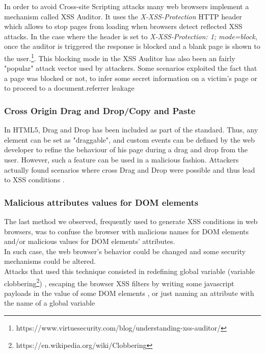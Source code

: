 \documentclass[journal]{IEEEtran}
\begin{document}
In order to avoid Cross-site Scripting attacks many web browsers implement a mechanism called XSS Auditor. It uses the \emph{X-XSS-Protection} HTTP header which allows to stop pages from loading when browsers detect reflected XSS attacks. In the case where the header is set to \emph{X-XSS-Protection: 1; mode=block}, once the auditor is triggered the response is blocked and a blank page is shown to the user.\footnote{https://www.virtuesecurity.com/blog/understanding-xss-auditor/}. This blocking mode in the XSS Auditor has also been an fairly "popular" attack vector used by attackers. Some scenarios exploited the fact that a page was blocked or not, to infer some secret information on a victim's page or to proceed to a document.referrer leakage \cite{CVE-2017-5045} \cite{CVE-2013-0909} \cite{CVE-2013-2848}

\medskip

\subsubsection*{\textbf{Cross Origin Drag and Drop/Copy and Paste}}

In HTML5, Drag and Drop has been included as part of the standard. Thus, any element can be set as "draggable", and custom events can be defined by the web developer to refine the behaviour of his page during a drag and drop from the user. However, such a feature can be used in a malicious fashion. Attackers actually found scenarios where cross Drag and Drop were possible and thus lead to XSS conditions \cite{CVE-2016-5226} \cite{CVE-2013-2849} \cite{CVE-2012-0455}.

\medskip

\subsubsection*{\textbf{Malicious attributes values for DOM elements}}

The last method we observed, frequently used to generate XSS conditions in web browsers, was to confuse the browser with malicious names for DOM elements and/or malicious values for DOM elements' attributes. \\
In such case, the web browser's behavior could be changed and some security mechanisms could be altered. \\
Attacks that used this technique consisted in redefining global variable (variable clobbering\footnote{https://en.wikipedia.org/wiki/Clobbering}) \cite{frameBustingLocationClubbered}, escaping the browser XSS filters by writing some javascript payloads in the value of some DOM elements \cite{CVE-2013-2849}, or just naming an attribute with the name of a global variable \cite{CVE-2012-4209} \cite{CVE-2012-3994} \cite{CVE-2012-4194}
\end{document}
